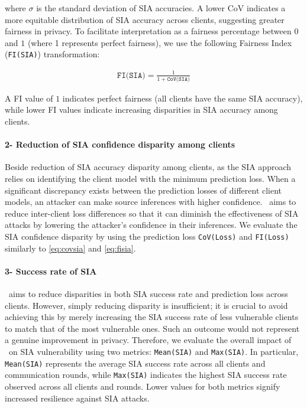 where $\sigma$ is the standard deviation of SIA accuracies. A lower CoV indicates a more equitable distribution of SIA accuracy across clients, suggesting greater fairness in privacy. To facilitate interpretation as a fairness percentage between $0$ and $1$ (where 1 represents perfect fairness), we use the following Fairness Index (\texttt{FI(SIA)}) transformation:

\begin{align}\label{eq:fisia}
\texttt{FI(SIA)} = \frac{1}{1 + \texttt{CoV(SIA)}} 
\end{align}

A FI value of $1$ indicates perfect fairness (all clients have the same SIA accuracy), while lower FI values indicate increasing disparities in SIA accuracy among clients.









\paragraph{\textbf{2- Reduction of SIA confidence disparity among clients}} Beside reduction of SIA accuracy disparity among clients, as the SIA approach relies on identifying the client model with the minimum prediction loss. When a significant discrepancy exists between the prediction losses of different client models, an attacker can make source inferences with higher confidence. \sysname\  aims to reduce inter-client loss differences so that it can diminish the effectiveness of SIA attacks by lowering the attacker's confidence in their inferences. We evaluate the SIA confidence disparity by using  the prediction loss \texttt{CoV(Loss)} and \texttt{FI(Loss)} similarly to \autoref{eq:covsia} and \autoref{eq:fisia}. 



\paragraph{\textbf{3- Success rate of SIA}}
\sysname\ aims to reduce disparities in both SIA success rate and prediction loss across clients. However, simply reducing disparity is insufficient; it is crucial to avoid achieving this by merely increasing the SIA success rate of less vulnerable clients to match that of the most vulnerable ones. Such an outcome would not represent a genuine improvement in privacy. Therefore, we evaluate the overall impact of \sysname\ on SIA vulnerability using two metrics: \texttt{Mean(SIA)} and \texttt{Max(SIA)}. In particular, \texttt{Mean(SIA)} represents the average SIA success rate across all clients and communication rounds, while \texttt{Max(SIA)} indicates the highest SIA success rate observed across all clients and rounds. Lower values for both metrics signify increased resilience against SIA attacks.

